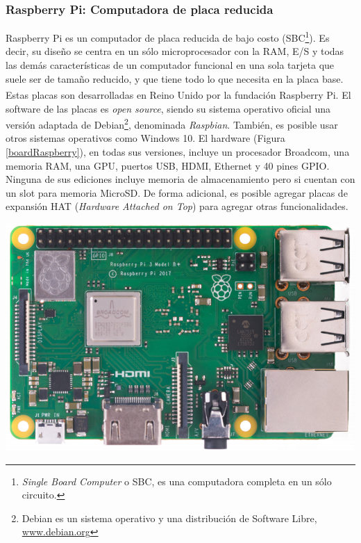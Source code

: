         \subsubsection{Raspberry Pi: Computadora de placa reducida}
            \par Raspberry\textsuperscript{\textregistered} Pi es un computador de placa reducida de bajo costo (SBC\footnote{\textit{Single Board Computer} o SBC, es una computadora completa en un sólo circuito.}). Es decir, su diseño se centra en un sólo microprocesador con la RAM, E/S y todas las demás características de un computador funcional en una sola tarjeta que suele ser de tamaño reducido, y que tiene todo lo que necesita en la placa base. Estas placas son desarrolladas en Reino Unido por la fundación Raspberry\textsuperscript{\textregistered} Pi. El software de las placas es \textit{open source}, siendo su sistema operativo oficial una versión adaptada de Debian\footnote{Debian es un sistema operativo y una distribución de Software Libre, \url{www.debian.org}}, denominada \textit{Raspbian}. También, es posible usar otros sistemas operativos como Windows 10. El hardware (Figura \ref{boardRaspberry}), en todas sus versiones, incluye un procesador Broadcom, una memoria RAM, una GPU, puertos USB, HDMI, Ethernet y 40 pines GPIO. Ninguna de sus ediciones incluye memoria de almacenamiento pero si cuentan con un slot para memoria MicroSD. De forma adicional, es posible agregar placas de expansión HAT (\textit{Hardware Attached on Top}) para agregar otras funcionalidades.
            
            \begin{center}
                \includegraphics[scale=0.30]{hardware/raspberrypib3.jpg}
                
                \label{boardRaspberry}
            \end{center}
           
